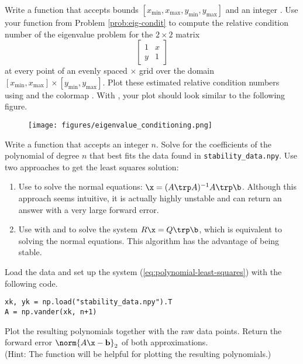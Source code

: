 Write a function that accepts bounds $[x_{\min},x_{\max},y_{\min},y_{\max}]$ and an integer .
Use your function from Problem \ref{prob:eig-condit} to compute the relative condition number of the eigenvalue problem for the $2\times 2$ matrix
\[
\left[\begin{array}{cc}
1 &  x\\
y & 1\end{array}\right]
\]
at every point of an evenly spaced $\times$ grid over the domain $[x_{\min}, x_{\max}]\times [y_{\min}, y_{\max}]$.
Plot these estimated relative condition numbers using  and the colormap .
With , your plot should look similar to the following figure.

\begin{figure}[H]
    \texttt{[image: figures/eigenvalue\_conditioning.png]}
\end{figure}

\label{prob:eigenvalue-conditioning-plot}

Write a function that accepts an integer $n$.
Solve for the coefficients of the polynomial of degree $n$ that best fits the data found in \texttt{stability\_data.npy}.
Use two approaches to get the least squares solution:

\begin{enumerate}
\item Use  to solve the normal equations: $\x = (A\trp A)^{-1}A\trp \b$.
Although this approach seems intuitive, it is actually highly unstable and can return an answer with a very large forward error.

\item Use  with  and  to solve the system $R\x = Q\trp\b$, which is equivalent to solving the normal equations.
This algorithm has the advantage of being stable.
\end{enumerate}

Load the data and set up the system (\ref{eq:polynomial-least-squares}) with the following code.

\begin{lstlisting}
xk, yk = np.load("stability_data.npy").T
A = np.vander(xk, n+1)
\end{lstlisting}

Plot the resulting polynomials together with the raw data points.
Return the forward error $\norm{A\x-\mathbf{b}}_2$ of both approximations.
\\(Hint: The function  will be helpful for plotting the resulting polynomials.)

